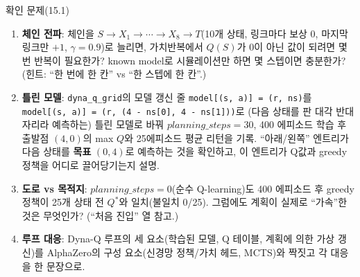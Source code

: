 \begin{frame}{확인 문제(15.1)}
  \small
  \begin{enumerate}
    \item \textbf{체인 전파}: 체인을 $S \to X_1 \to \cdots \to X_8
      \to T$(10개 상태, 링크마다 보상 0, 마지막 링크만 $+1$,
      $\gamma=0.9$)로 늘리면, 가치반복에서 $Q(S)$가 0이 아닌 값이
      되려면 몇 번 반복이 필요한가? known model로 시뮬레이션만
      하면 몇 스텝이면 충분한가? (힌트: ``한 번에 한 칸'' vs
      ``한 스텝에 한 칸''.)
    \item \textbf{틀린 모델}: \texttt{dyna\_q\_grid}의 모델 갱신 줄
      \texttt{model[(s, a)] = (r, ns)}를
      \texttt{model[(s, a)] = (r, (4 - ns[0], 4 - ns[1]))}로
      (다음 상태를 판 대각 반대 자리라 예측하는) 틀린 모델로 바꿔
      $planning\_steps{=}30$, 400 에피소드 학습 후 출발점
      $(4,0)$의 max $Q$와 25에피소드 평균 리턴을 기록.
      ``아래/왼쪽'' 엔트리가 다음 상태를 \textbf{목표} $(0,4)$로
      예측하는 것을 확인하고, 이 엔트리가 Q값과 greedy 정책을
      어디로 끌어당기는지 설명.
    \item \textbf{도로 vs 목적지}: $planning\_steps{=}0$(순수
      Q-learning)도 400 에피소드 후 greedy 정책이 25개 상태 전
      $Q^{*}$와 일치(불일치 0/25). 그럼에도 계획이 실제로
      ``가속''한 것은 무엇인가? (``처음 진입'' 열 참고.)
    \item \textbf{루프 대응}: Dyna-Q 루프의 세 요소(학습된 모델,
      Q 테이블, 계획에 의한 가상 갱신)를 AlphaZero의 구성
      요소(신경망 정책/가치 헤드, MCTS)와 짝짓고 각 대응을
      한 문장으로.
  \end{enumerate}
\end{frame}
